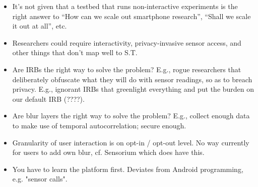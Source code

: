 \begin{itemize}
  \item It's not given that a testbed that runs non-interactive 
experiments is the right answer to ``How can we scale out 
smartphone research'', ``Shall we scale it out at all'', etc.
  \item Researchers could require interactivity, privacy-invasive 
sensor access, and other things that don't map well to S.T.
  \item Are IRBs the right way to solve the problem? E.g., 
rogue researchers that deliberately obfuscate what they will 
do with sensor readings, so as to breach privacy. E.g., 
ignorant IRBs that greenlight everything and put the burden on 
our default IRB (????).
  \item Are blur layers the right way to solve the problem? E.g., 
collect enough data to make use of temporal autocorrelation; secure enough.
  \item Granularity of user interaction is on opt-in / opt-out 
level. No way currently for users to add own blur, cf. Sensorium 
which does have this.
  \item You have to learn the platform first. Deviates from Android programming, e.g. "sensor calls".
\end{itemize}

